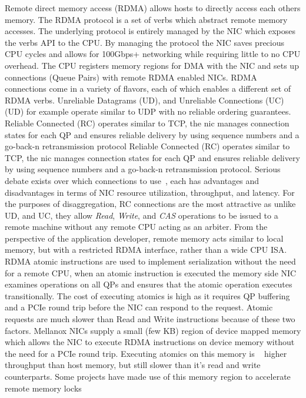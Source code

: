 Remote direct memory access (RDMA) allows hosts to directly
access each others memory. The RDMA protocol is a set of
verbs which abstract remote memory accesses. The underlying
protocol is entirely managed by the NIC which exposes the
verbs API to the CPU. By managing the protocol the NIC saves
precious CPU cycles and allows for 100Gbps+ networking while
requiring little to no CPU overhead. The CPU registers
memory regions for DMA with the NIC and sets up connections
(Queue Pairs) with remote RDMA enabled NICs. RDMA
connections come in a variety of flavors, each of which
enables a different set of RDMA verbs. Unreliable Datagrams
(UD), and Unreliable Connections (UC) (UD) for example
operate similar to UDP with no reliable ordering guarantees.
Reliable Connected (RC) operates similar to TCP, the nic
manages connection states for each QP and ensures reliable
delivery by using sequence numbers and a go-back-n
retransmission protocol Reliable Connected (RC) operates
similar to TCP, the nic manages connection states for each
QP and ensures reliable delivery by using sequence numbers
and a go-back-n retransmission protocol.  Serious debate
exists over which connections to
use~\cite{storm,cell,herd,faast,farm}, each has advantages
and disadvantages in terms of NIC resource utilization,
throughput, and latency. For the purposes of disaggregation,
RC connections are the most attractive as unlike UD, and UC,
they allow \textit{Read}, \textit{Write}, and \textit{CAS}
operations to be issued to a remote machine without any
remote CPU acting as an arbiter. From the perspective of the
application developer, remote memory acts similar to local
memory, but with a restricted RDMA interface, rather than a
wide CPU ISA. RDMA atomic instructions are used to implement
serialization without the need for a remote CPU, when an
atomic instruction is executed the memory side NIC examines
operations on all QPs and ensures that the atomic operation
executes transitionally. The cost of executing atomics is
high as it requires QP buffering and a PCIe round trip
before the NIC can respond to the request. Atomic requests
are much slower than Read and Write instructions because of
these two factors. Mellanox NICs supply a small (few KB)
region of device mapped memory which allows the NIC to
execute RDMA instructions on device memory without the need
for a PCIe round trip. Executing atomics on this memory is
~ higher throughput than host memory, but still
slower than it's read and write counterparts. Some projects
have made use of this memory region to accelerate remote
memory locks~\cite{sherman}


